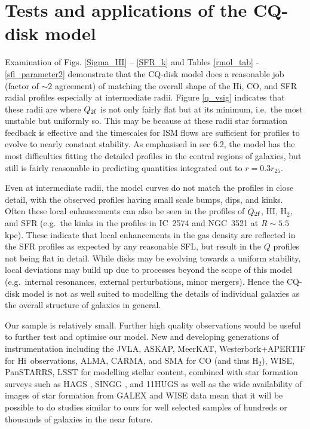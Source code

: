 \documentclass[12pt,preprint]{aastex}
\newcommand{\HI}{\mbox{\sc Hi}}
\begin{document}
\section{Tests and applications of the CQ-disk model} 
\label{application}

Examination of Figs. \ref{Sigma_HI} -- \ref{SFR_k} and Tables
\ref{rmol_tab} - \ref{sfl_parameter2} demonstrate that the CQ-disk model
does a reasonable job (factor of $\sim 2$ agreement) of matching the
overall shape of the \HI, CO, and SFR radial profiles especially at
intermediate radii. Figure \ref{q_vsig} indicates that these radii are
where $Q_{\rm 2f}$ is not only fairly flat but at its minimum, i.e.\ the
most unstable but uniformly so. This may be because at these radii star
formation feedback is effective and the timescales for ISM flows are
sufficient for profiles to evolve to nearly constant stability. As
emphasised in sec 6.2, the model has the most difficulties fitting the
detailed profiles in the central regions of galaxies, but still is
fairly reasonable in predicting quantities integrated out to $r = 0.3
r_{25}$.

Even at intermediate radii, the model curves do not match the profiles
in close detail, with the observed profiles having small scale bumps,
dips, and kinks. Often these local enhancements can also be seen in the
profiles of $Q_{\rm 2f}$, HI, H$_2$, and SFR (e.g.\ the kinks in the
profiles in IC~2574 and NGC~3521 at $R \sim 5.5$ kpc). These indicate
that local enhancements in the gas density are reflected in the SFR
profiles as expected by any reasonable SFL, but result in the $Q$
profiles not being flat in detail. While disks may be evolving towards a
uniform stability, local deviations may build up due to processes beyond
the scope of this model (e.g.\ internal resonances, external
perturbations, minor mergers). Hence the CQ-disk model is not as well
suited to modelling the details of individual galaxies as the overall structure of galaxies in general.

Our sample is relatively small. Further high quality observations would
be useful to further test and optimise our model. New and developing
generations of instrumentation including the JVLA, ASKAP, MeerKAT,
Westerbork+APERTIF for \HI\ observations, ALMA, CARMA, and SMA for CO
(and thus H$_2$), WISE, PanSTARRS, LSST for modelling stellar content,
combined with star formation surveys such as HAGS \citep{jam04}, SINGG
\citep{meu06}, and 11HUGS \citep{ken08} as well as the wide availability
of images of star formation from GALEX and WISE data mean that it will
be possible to do studies similar to ours for well selected samples of
hundreds or thousands of galaxies in the near future.
\end{document}
